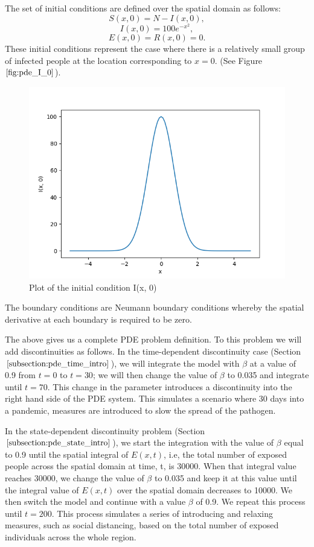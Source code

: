 \documentclass{article}
\begin{document}
The set of initial conditions are defined over the spatial domain as follows:
\begin{equation}
S(x, 0) = N - I(x, 0),
\end{equation}
\begin{equation}
I(x, 0) = 100e^{-x^2},
\end{equation}
\begin{equation}
E(x, 0) = R(x, 0) = 0.
\end{equation}
These initial conditions represent the case where there is a relatively small group of infected people at the location corresponding to $x=0$. (See Figure $\ref{fig:pde_I_0}$).

\begin{figure}[H]
\centering
\includegraphics[width=0.7\linewidth]{./figures/pde_I_0}
\caption{Plot of the initial condition I(x, 0)}
\label{fig:pde_I_0}
\end{figure}

The boundary conditions are Neumann boundary conditions whereby the spatial derivative at each boundary is required to be zero.

The above gives us a complete PDE problem definition. To this problem we will add discontinuities as follows. 
In the time-dependent discontinuity case (Section $\ref{subsection:pde_time_intro}$), we will integrate the model with $\beta$ at a value of 0.9 from $t=0$ to $t=30$; we will then change the value of $\beta$ to 0.035 and integrate until $t=70$. This change in the parameter introduces a discontinuity into the right hand side of the PDE system. This simulates a scenario where 30 days into a pandemic, measures are introduced to slow the spread of the pathogen.

In the state-dependent discontinuity problem (Section $\ref{subsection:pde_state_intro}$), we start the integration with the value of $\beta$ equal to 0.9 until the spatial integral of $E(x, t)$, i.e, the total number of exposed people across the spatial domain at time, t, is 30000. When that integral value reaches 30000, we change the value of $\beta$ to 0.035 and keep it at this value until the integral value of $E(x, t)$ over the spatial domain decreases to 10000. We then switch the model and continue with a value $\beta$ of 0.9. We repeat this process until $t=200$. This process simulates a series of introducing and relaxing measures, such as social distancing, based on the total number of exposed individuals across the whole region.
\end{document}
